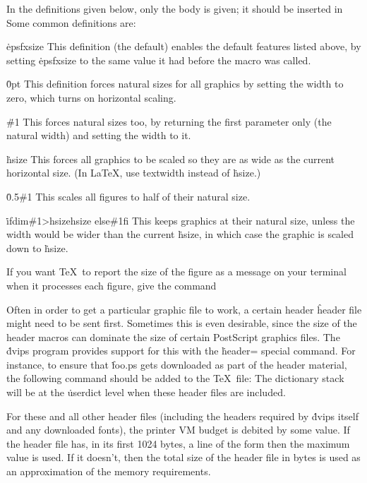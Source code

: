 In the definitions given below, only the body is given; it should be inserted
in
\noindent
Some common definitions are:

{\options
\.{\ttbackslash epsfxsize}
This definition (the default) enables the default features listed above,
by setting \.{\ttbackslash epsfxsize} to the same value it had before
the macro was called.

\.{0pt}
This definition forces natural sizes for all graphics by setting the width to
zero, which turns on horizontal scaling.

\.{\#1}
This forces natural sizes too, by returning the first parameter only
(the natural width) and setting the width to it.

\.{\ttbackslash hsize}
This forces all graphics to be scaled so they are as wide as the current
horizontal size.  (In La\TeX, use \.{\ttbackslash textwidth} instead
of \.{\ttbackslash hsize}.)

\.{0.5\#1}
This scales all figures to half of their natural size.

\.{\ttbackslash ifdim\#1>\ttbackslash hsize\ttbackslash hsize\ttbackslash
else\#1\ttbackslash fi}
This keeps graphics at their natural size, unless the width would be wider
than the current \.{\ttbackslash hsize}, in which case the graphic is
scaled down to \.{\ttbackslash hsize}.\par}

If you want \TeX\ to report the size of the figure as a message
on your terminal when it processes each figure, give the command


Often in order to get a particular graphic file to work, a certain header
\^{header}
file might need to be sent first.  Sometimes this is even desirable, since
the size of the header macros can dominate the size of certain PostScript
graphics files.  The \.{dvips} program provides support for this with the
\.{header=} special command.  For instance, to ensure that \.{foo.ps}
gets downloaded as part of the header material, the following command
should be added to the \TeX\ file:
\noindent
The dictionary stack will be at the \.{userdict} level when these header
files are included.

For these and all other header files (including the headers required
by \.{dvips} itself and any downloaded fonts), the printer VM budget is
debited by some value.	If the header file has, in its first 1024 bytes,
a line of the form
\noindent
then the maximum value is used.  If it doesn't, then the total size of
the header file in bytes is used as an approximation of the memory
requirements.

